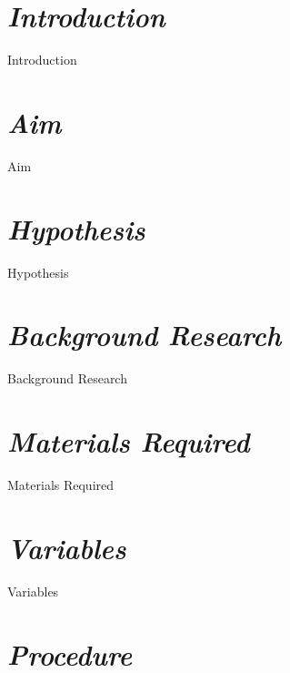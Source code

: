\documentclass[12pt, a4paper]{article}
\begin{document}
\maketitle

\tableofcontents
\clearpage



\begin{abstract}
    {Abstract}
\end{abstract}



\section{\textit{Introduction}}
        
        {Introduction}       
        
\section{\textit{Aim}}
        
        {Aim}

\section{\textit{Hypothesis}}
        
        {Hypothesis}    
        
\section{\textit{Background Research}}
        
        {Background Research}
        
\section{\textit{Materials Required}}
        
        {Materials Required}
        
\section{\textit{Variables}}
        
        {Variables}
        
\section{\textit{Procedure}}
        
\end{document}
